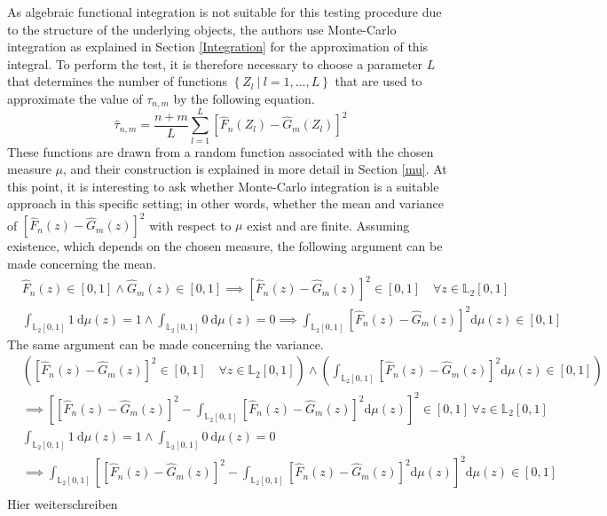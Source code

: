 \documentclass[12pt, a4paper]{article}
\theoremstyle{MAstyle} \newtheorem{assumption}{Assumption}[section]
\theoremstyle{MAstyle} \newtheorem{definition}{Definition}[section]
\theoremstyle{MAstyle} \newtheorem{theorem}{Theorem}[section]
\begin{document}
			As algebraic functional integration is not suitable for this testing procedure due to the structure of the underlying objects, the authors use Monte-Carlo integration as explained in Section \ref{Integration} for the approximation of this integral. To perform the test, it is therefore necessary to choose a parameter $L$ that determines the number of functions $\left\{Z_l \ \vert \ l = 1, \dots, L\right\}$ that are used to approximate the value of $\tau_{n,m}$ by the following equation.
			\begin{equation}
				\hat{\tau}_{n,m} = \frac{n+m}{L} \sum_{l = 1}^{L} \left[\hat{F}_n(Z_l) - \hat{G}_m(Z_l)\right]^2
			\end{equation}
			These functions are drawn from a random function associated with the chosen measure $\mu$, and their construction is explained in more detail in Section \ref{mu}. At this point, it is interesting to ask whether Monte-Carlo integration is a suitable approach in this specific setting; in other words, whether the mean and variance of $\left[\hat{F}_n(z) - \hat{G}_m(z)\right]^2$ with respect to $\mu$ exist and are finite.
			Assuming existence, which depends on the chosen measure, the following argument can be made concerning the mean.
			\begin{equation}
				\begin{split}
					& \hat{F}_n(z) \in [0,1] 	\land \hat{G}_m(z) \in [0,1] \implies \left[\hat{F}_n(z) - \hat{G}_m(z)\right]^2 \in [0,1] \quad \forall z \in \mathbb{L}_2[0,1]\\
					& \int_{\mathbb{L}_2[0,1]} 1 \ \mathrm{d}\mu(z) = 1 \land \int_{\mathbb{L}_2[0,1]} 0 \ \mathrm{d}\mu(z) = 0 \implies \int_{\mathbb{L}_2[0,1]}\left[\hat{F}_n(z) - \hat{G}_m(z)\right]^2 \mathrm{d}\mu(z) \in [0,1]
				\end{split}
			\end{equation}			 
			 The same argument can be made concerning the variance.
			 \begin{equation}
			 	\begin{split}
			 		& \left(\left[\hat{F}_n(z) - \hat{G}_m(z)\right]^2 \in [0,1] \quad \forall z \in \mathbb{L}_2[0,1]\right) \land \left(\int_{\mathbb{L}_2[0,1]}\left[\hat{F}_n(z) - \hat{G}_m(z)\right]^2 \mathrm{d}\mu(z) \in [0,1] \right)\\
			 		& \implies \left[ \left[\hat{F}_n(z) - \hat{G}_m(z)\right]^2 - \int_{\mathbb{L}_2[0,1]}\left[\hat{F}_n(z) - \hat{G}_m(z)\right]^2 \mathrm{d}\mu(z) \right]^2 \in [0,1] \ \forall z \in \mathbb{L}_2[0,1]\\
			 		& \int_{\mathbb{L}_2[0,1]} 1 \ \mathrm{d}\mu(z) = 1 \land \int_{\mathbb{L}_2[0,1]} 0 \ \mathrm{d}\mu(z) = 0 \\
			 		& \implies \int_{\mathbb{L}_2[0,1]}\left[ \left[\hat{F}_n(z) - \hat{G}_m(z)\right]^2 - \int_{\mathbb{L}_2[0,1]}\left[\hat{F}_n(z) - \hat{G}_m(z)\right]^2 \mathrm{d}\mu(z) \right]^2 \mathrm{d}\mu(z) \in [0,1] \\
			 	\end{split}
			 \end{equation}
			 {\color{red} Hier weiterschreiben}\\
		
\end{document}
